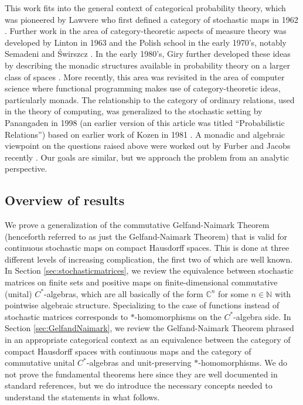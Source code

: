 \documentclass[12pt]{article}
\theoremstyle{theorem}
\theoremstyle{definition}
\numberwithin{equation}{section}
\let\C=\Chi \let\W=\Omega
\newcommand{\<}{\langle}
\renewcommand{\>}{\rangle}
\def\C{{{\mathbb C}}}
\def\N{{{\mathbb N}}}
\begin{document}
This work fits into the general context of categorical probability theory, which 
was pioneered by Lawvere who first defined a category of stochastic maps in 
1962 \cite{La62}. 
Further work in the area of category-theoretic aspects of measure 
theory was developed by Linton in 1963 \cite{Li63}
and the Polish school in the early 1970's, 
notably Semadeni \cite{Se73} and \'Swirszcz \cite{Sw74}.
In the early 1980's, Giry further developed these ideas by describing the monadic
structures available in probability theory on a larger class of spaces \cite{Gi82}. 
More recently, this area was revisited in the area of computer science 
where functional programming makes use of category-theoretic ideas,
particularly monads. The relationship to the category of ordinary relations,
used in the theory of computing, was generalized to the stochastic
setting by Panangaden in 1998 \cite{Pa99} (an earlier version of this
article was titled ``Probabilistic Relations'') based on earlier work of Kozen
in 1981 \cite{Ko81}.
A monadic and algebraic viewpoint on the questions raised above were worked
out by Furber and Jacobs recently \cite{FuJa13}. Our goals are similar, 
but we approach the problem from an analytic perspective. 

\subsection{Overview of results}

We prove a generalization of the commutative Gelfand-Naimark Theorem
(henceforth referred to as just the Gelfand-Naimark Theorem)
that is valid for continuous stochastic maps on compact Hausdorff spaces. 
This is done at three different levels of increasing complication, 
the first two of which are well known.  
In Section \ref{sec:stochasticmatrices}, 
we review the equivalence between stochastic matrices
on finite sets and positive maps on finite-dimensional commutative (unital)
$C^*$-algebras, which are all basically of the form $\C^{n}$ for some $n\in\N$
with pointwise algebraic structure. Specializing to the case of functions instead of 
stochastic matrices corresponds to $*$-homomorphisms on the
$C^*$-algebra side. In Section \ref{sec:GelfandNaimark}, 
we review the Gelfand-Naimark
Theorem phrased in an appropriate categorical context as an equivalence
between the category of compact Hausdorff spaces with continuous maps
and the category of commutative unital $C^*$-algebras and unit-preserving
$*$-homomorphisms. We do not prove the fundamental theorems 
here since they are well documented in standard references, 
but we do introduce the necessary concepts needed to understand 
the statements in what follows. 
\end{document}
